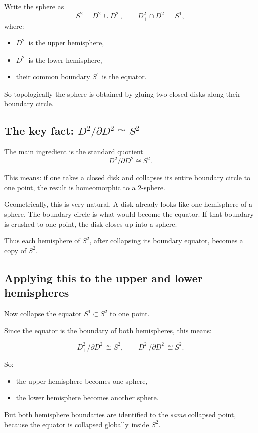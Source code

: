 \documentclass[12pt,a4paper]{article}
\theoremstyle{notespace}
\begin{document}
Write the sphere as
\[
S^2=D^2_+ \cup D^2_-,
\qquad
D^2_+ \cap D^2_- = S^1,
\]
where:
\begin{itemize}
	\item \(D^2_+\) is the upper hemisphere,
	\item \(D^2_-\) is the lower hemisphere,
	\item their common boundary \(S^1\) is the equator.
\end{itemize}

So topologically the sphere is obtained by gluing two closed disks along their boundary circle.

\subsection{The key fact: \(D^2/\partial D^2 \cong S^2\)}

The main ingredient is the standard quotient
\[
D^2/\partial D^2 \cong S^2.
\]

This means: if one takes a closed disk and collapses its entire boundary circle to one point, the result is homeomorphic to a \(2\)-sphere.

Geometrically, this is very natural. A disk already looks like one hemisphere of a sphere. The boundary circle is what would become the equator. If that boundary is crushed to one point, the disk closes up into a sphere.

Thus each hemisphere of \(S^2\), after collapsing its boundary equator, becomes a copy of \(S^2\).

\subsection{Applying this to the upper and lower hemispheres}

Now collapse the equator \(S^1\subset S^2\) to one point.

Since the equator is the boundary of both hemispheres, this means:

\[
D^2_+/\partial D^2_+ \cong S^2,
\qquad
D^2_-/\partial D^2_- \cong S^2.
\]

So:
\begin{itemize}
	\item the upper hemisphere becomes one sphere,
	\item the lower hemisphere becomes another sphere.
\end{itemize}

But both hemisphere boundaries are identified to the \emph{same} collapsed point, because the equator is collapsed globally inside \(S^2\).
\end{document}
